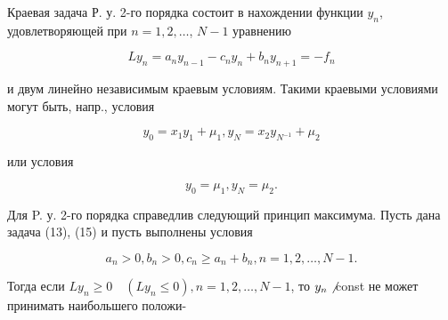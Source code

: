 \documentclass[10pt]{article}
\begin{document}
Краевая задача Р. у. 2-го порядка состоит в нахождении функции $y_{n}$, удовлетворяющей при $n=1,2, \ldots$, $N-1$ уравнению



\[

L y_{n}=a_{n} y_{n-1}-c_{n} y_{n}+b_{n} y_{n+1}=-f_{n}

\]



и двум линейно независимым краевым условиям. Такими краевыми условиями могут быть, напр., условия



\[

y_{0}=x_{1} y_{1}+\mu_{1}, y_{N}=x_{2} y_{N^{-1}}+\mu_{2}

\]



или условия



\[

y_{0}=\mu_{1}, y_{N}=\mu_{2} .

\]



Для P. у. 2-го порядка справедлив следующий принцип максимума. Пусть дана задача (13), (15) и пусть выполнены условия



\[

a_{n}>0, b_{n}>0, c_{n} \geqslant a_{n}+b_{n}, n=1,2, \ldots, N-1 .

\]



Тогда если $L y_{n} \geqslant 0 \quad\left(L y_{n} \leqslant 0\right), n=1,2, \ldots, N-1$, то $y_{n} \not$ const не может принимать наибольшего положи-
\end{document}
